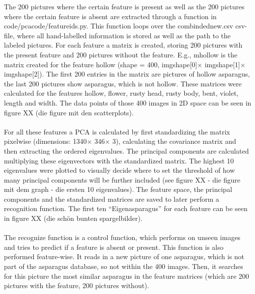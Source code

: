 The 200 pictures where the certain feature is present as well as the 200 pictures where the certain feature is absent are extracted through a function in code/\-pca\-\textunderscore \-code/\-feature\-\textunderscore \-ids.py. This function loops over the combinded\textunderscore new.csv csv-file, where all hand-labelled information is stored as well as the path to the labeled pictures. For each feature a matrix is created, storing 200 pictures with the present feature and 200 pictures without the feature. E.g., m\textunderscore hollow is the matrix created for the feature hollow (shape = 400, img\textunderscore shape[0]$\times$ img\textunderscore shape[1]$\times$ img\textunderscore shape[2]). The first 200 entries in the matrix are pictures of hollow asparagus, the last 200 pictures show asparagus, which is not hollow. These matrices were calculated for the features hollow,  flower, rusty head, rusty body, bent, violet, length and width. The data points of those 400 images in 2D space can be seen in figure XX (die figure mit den scatterplots).  \\
\\
For all these features a PCA is calculated by first standardizing the matrix pixelwise (dimensions: 1340$\times$ 346$\times$ 3), calculating the covariance matrix and then extracting the ordered eigenvalues. The principal components are calculated multiplying these eigenvectors with the standardized matrix. The highest 10 eigenvalues were plotted to visually decide where to set the threshold of how many principal components will be further included (see figure XX - die figure mit dem graph - die ersten 10 eigenvalues). The feature space, the principal components and the standardized matrices are saved to later perform a recognition function. The first ten “Eigenasparagus” for each feature can be seen in figure XX (die schön bunten spargelbilder).  \\
\\
The recognize function is a control function, which performs on unseen images and tries to predict if a feature is absent or present. This function is also performed feature-wise. It reads in a new picture of one asparagus, which is not part of the asparagus database, so not within the 400 images. Then, it searches for this picture the most similar asparagus in the feature matrices (which are 200 pictures with the feature, 200 pictures without).  \\
